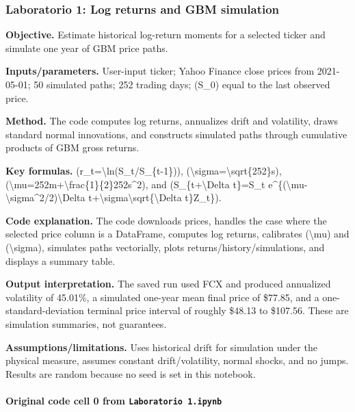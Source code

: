 \documentclass[
  11pt,
]{article}
\begin{document}
\subsubsection{Laboratorio 1: Log returns and GBM simulation}\label{laboratorio-1-log-returns-and-gbm-simulation}

\textbf{Objective.} Estimate historical log-return moments for a selected ticker and simulate one year of GBM price paths.

\textbf{Inputs/parameters.} User-input ticker; Yahoo Finance close prices from 2021-05-01; 50 simulated paths; 252 trading days; (S\_0) equal to the last observed price.

\textbf{Method.} The code computes log returns, annualizes drift and volatility, draws standard normal innovations, and constructs simulated paths through cumulative products of GBM gross returns.

\textbf{Key formulas.} (r\_t=\textbackslash ln(S\_t/S\_\{t-1\})), (\textbackslash sigma=\textbackslash sqrt\{252\}s), (\textbackslash mu=252m+\textbackslash frac\{1\}\{2\}252s\^{}2), and (S\_\{t+\textbackslash Delta t\}=S\_t e\^{}\{(\textbackslash mu-\textbackslash sigma\^{}2/2)\textbackslash Delta t+\textbackslash sigma\textbackslash sqrt\{\textbackslash Delta t\}Z\_t\}).

\textbf{Code explanation.} The code downloads prices, handles the case where the selected price column is a DataFrame, computes log returns, calibrates (\textbackslash mu) and (\textbackslash sigma), simulates paths vectorially, plots returns/history/simulations, and displays a summary table.

\textbf{Output interpretation.} The saved run used FCX and produced annualized volatility of 45.01\%, a simulated one-year mean final price of \$77.85, and a one-standard-deviation terminal price interval of roughly \$48.13 to \$107.56. These are simulation summaries, not guarantees.

\textbf{Assumptions/limitations.} Uses historical drift for simulation under the physical measure, assumes constant drift/volatility, normal shocks, and no jumps. Results are random because no seed is set in this notebook.

\paragraph{\texorpdfstring{Original code cell 0 from \texttt{Laboratorio\ 1.ipynb}}{Original code cell 0 from Laboratorio 1.ipynb}}\label{original-code-cell-0-from-laboratorio-1ipynb}
\end{document}
